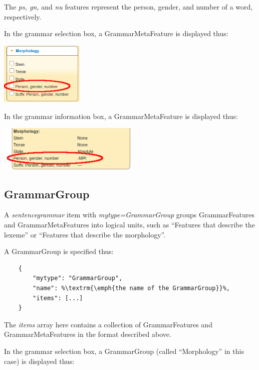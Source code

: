 \documentclass[11pt,oneside,a4paper]{memoir}
\begin{document}
The \emph{ps, gn,} and \emph{nu} features represent the person, gender, and number of a word,
respectively.


\Needspace*{5cm}%
In the grammar selection box, a GrammarMetaFeature is displayed thus:

\begin{center}
  \includegraphics[width=0.3\textwidth]{pgn1.png}
\end{center}

\Needspace*{5cm}%
In the grammar information box, a GrammarMetaFeature is displayed thus:

\begin{center}
  \includegraphics[width=0.5\textwidth]{pgn2.png}
\end{center}


\subsection{GrammarGroup}\label{sec-grammargroup}

A \emph{sentencegrammar} item with \emph{mytype=GrammarGroup} groups GrammarFeatures and
GrammarMetaFeatures into logical units, such as ``Features that describe the lexeme'' or ``Features
that describe the morphology''.

A GrammarGroup is specified thus:

\begin{lstlisting}
    {
        "mytype": "GrammarGroup",
        "name": %\textrm{\emph{the name of the GrammarGroup}}%,
        "items": [...]
    }
\end{lstlisting}

The \emph{items} array here contains a collection of GrammarFeatures and GrammarMetaFeatures in the
format described above.

\Needspace*{5cm}%
In the grammar selection box, a GrammarGroup (called ``Morphology'' in this case) is displayed thus:
\end{document}
